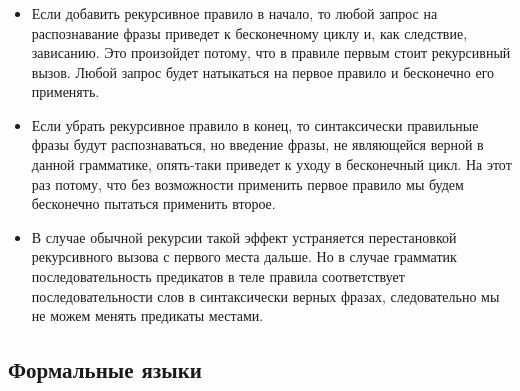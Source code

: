 \begin{frame}

	\frametitle{\insertsection}
	\framesubtitle{\insertsubsection}
	
	\begin{itemize}
		\item Если добавить рекурсивное правило в начало, то любой запрос на распознавание фразы приведет к бесконечному циклу и, как следствие, зависанию.
		Это произойдет потому, что в правиле первым стоит рекурсивный вызов. Любой запрос будет натыкаться на первое правило и бесконечно его применять.
		\item Если убрать рекурсивное правило в конец, то синтаксически правильные фразы будут распознаваться, но введение фразы, не являющейся верной в данной
		грамматике, опять-таки приведет к уходу в бесконечный цикл. На этот раз потому, что без возможности применить первое правило мы будем бесконечно пытаться применить второе.
		\item В случае обычной рекурсии такой эффект устраняется перестановкой рекурсивного вызова с первого места дальше. Но в случае грамматик последовательность
		предикатов в теле правила соответствует последовательности слов в синтаксически верных фразах, следовательно мы не можем менять предикаты местами.
	\end{itemize}

\end{frame}


\subsection{Формальные языки}


